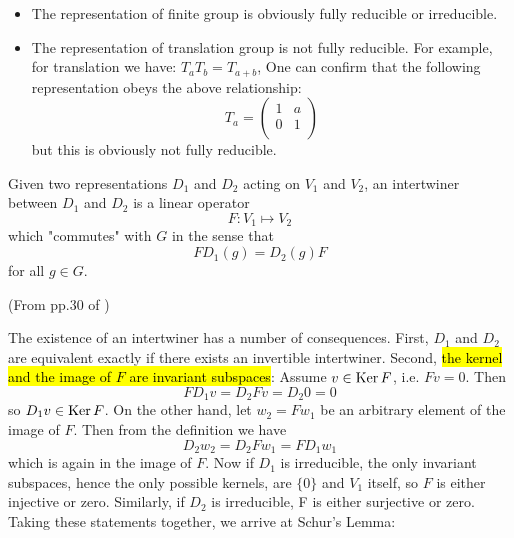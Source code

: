 \begin{ex}$ $

    \begin{itemize}
        \item The representation of finite group is obviously fully
            reducible or irreducible.
        \item The representation of translation group is not fully
            reducible. For example, for translation we have:
            $T_a T_b = T_{a+b}$,
            One can confirm that the following representation obeys
            the above relationship:
            $$T_a = \left( \begin{array}{cc}
                 1 & a \\
                 0 & 1 \\
            \end{array} \right)$$
            but this is obviously not fully reducible.
    \end{itemize}
\end{ex}

\begin{defi}[Interwiner]
    Given two representations $D_1$ and $D_2$ acting on $V_1$ and
    $V_2$, an intertwiner between $D_1$ and $D_2$ is a linear operator
    \begin{equation}
        F: V_1 \mapsto V_2
    \end{equation}
    which "commutes" with $G$ in the sense that
    \begin{equation}
        F D_1(g) = D_2(g) F
    \end{equation}
    for all $g\in G$.
\end{defi}

(From pp.30 of \cite{Ludeling})

The existence of an intertwiner has a number of consequences. First,
$D_1$ and $D_2$ are equivalent exactly if there exists an invertible
intertwiner. Second, \hl{the kernel and the image of $F$ are invariant
subspaces}: Assume $v\in \operatorname{Ker}{F}$, i.e. $Fv = 0$. Then
\begin{equation}
    FD_1 v = D_2 F v = D_2 0 = 0
\end{equation}
so $D_1 v\in \operatorname{Ker}{F}$. On the other hand, let $w_2 = Fw_1$ be an
arbitrary element of the image of $F$. Then from the definition we have
\begin{equation}
    D_2 w_2 = D_2 F w_1 = FD_1 w_1
\end{equation}
which is again in the image of $F$. Now if $D_1$ is irreducible, the only invariant subspaces,
hence the only possible kernels, are $\{0\}$ and $V_1$ itself, so $F$ is either injective or zero.
Similarly, if $D_2$ is irreducible, F is either surjective or zero. Taking these statements together, we arrive at Schur’s Lemma: 

